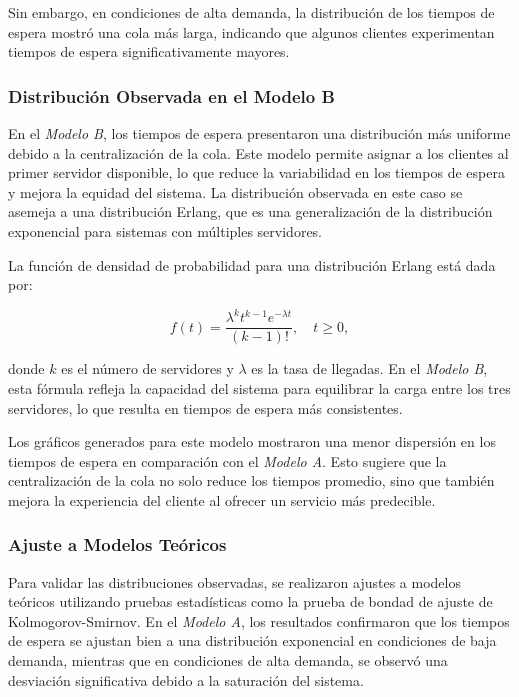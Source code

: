 \documentclass[a4paper,12pt]{article}
\begin{document}
Sin embargo, en condiciones de alta demanda, la distribución de los tiempos de espera mostró una cola más larga, indicando que algunos clientes experimentan tiempos de espera significativamente mayores.

\subsubsection{Distribución Observada en el Modelo B}

En el \textit{Modelo B}, los tiempos de espera presentaron una distribución más uniforme debido a la centralización de la cola. Este modelo permite asignar a los clientes al primer servidor disponible, lo que reduce la variabilidad en los tiempos de espera y mejora la equidad del sistema. La distribución observada en este caso se asemeja a una distribución Erlang, que es una generalización de la distribución exponencial para sistemas con múltiples servidores.

La función de densidad de probabilidad para una distribución Erlang está dada por:

\[
f(t) = \frac{\lambda^k t^{k-1} e^{-\lambda t}}{(k-1)!}, \quad t \geq 0,
\]

donde \( k \) es el número de servidores y \( \lambda \) es la tasa de llegadas. En el \textit{Modelo B}, esta fórmula refleja la capacidad del sistema para equilibrar la carga entre los tres servidores, lo que resulta en tiempos de espera más consistentes.

Los gráficos generados para este modelo mostraron una menor dispersión en los tiempos de espera en comparación con el \textit{Modelo A}. Esto sugiere que la centralización de la cola no solo reduce los tiempos promedio, sino que también mejora la experiencia del cliente al ofrecer un servicio más predecible.

\subsubsection{Ajuste a Modelos Teóricos}

Para validar las distribuciones observadas, se realizaron ajustes a modelos teóricos utilizando pruebas estadísticas como la prueba de bondad de ajuste de Kolmogorov-Smirnov. En el \textit{Modelo A}, los resultados confirmaron que los tiempos de espera se ajustan bien a una distribución exponencial en condiciones de baja demanda, mientras que en condiciones de alta demanda, se observó una desviación significativa debido a la saturación del sistema.
\end{document}
